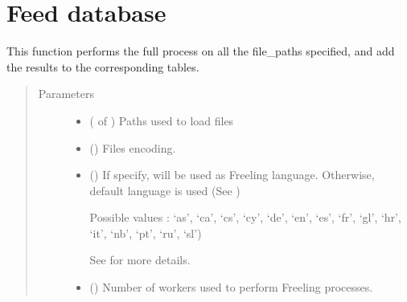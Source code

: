 \documentclass[letterpaper,10pt,english]{sphinxmanual}
\begin{document}
\section{Feed database}
\label{\detokenize{process:module-loacore.process.file_process}}\label{\detokenize{process:feed-database}}

\begin{fulllineitems}
\label{\detokenize{process:loacore.process.file_process.add_files}}
This function performs the full process on all the file\_paths specified, and add the results to the corresponding
tables.
\begin{quote}\begin{description}
\item[{Parameters}] \leavevmode\begin{itemize}
\item {} 
 ( of ) \textendash{} Paths used to load files

\item {} 
 () \textendash{} Files encoding.

\item {} 
 () \textendash{} 
If specify,  will be used as Freeling language.
Otherwise, default language is used (See )

Possible values : ‘as’, ‘ca’, ‘cs’, ‘cy’, ‘de’, ‘en’, ‘es’, ‘fr’, ‘gl’, ‘hr’, ‘it’, ‘nb’, ‘pt’, ‘ru’, ‘sl’)

See  for more details.


\item {} 
 () \textendash{} 
Number of workers used to perform Freeling processes.


\end{itemize}
\end{description}
\end{quote}
\end{fulllineitems}
\end{document}
